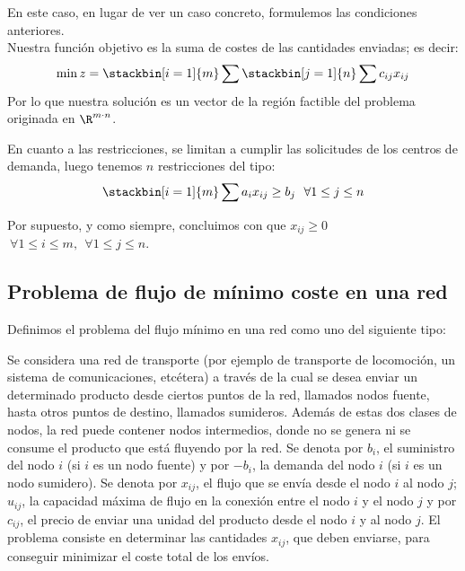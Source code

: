 \begin{ejem} En este caso, en lugar de ver un caso concreto, formulemos las condiciones anteriores.\\

Nuestra función objetivo es la suma de costes de las cantidades enviadas; es decir:
\[\min z=\stackbin[i=1]{m}\sum\stackbin[j=1]{n}\sum c_{ij}x_{ij}\]
Por lo que nuestra solución es un vector de la región factible del problema originada en $\R^{m\cdot n}$.

En cuanto a las restricciones, se limitan a cumplir las solicitudes de los centros de demanda, luego tenemos $n$ restricciones del tipo:
\[\stackbin[i=1]{m}\sum a_ix_{ij}\geq b_j\ \ \forall 1\leq j\leq n\]

Por supuesto, y como siempre, concluimos con que $x_{ij}\geq 0$ $\ \forall 1\leq i\leq m,\ \ \forall 1\leq j\leq n$.
\end{ejem}

\subsection{Problema de flujo de mínimo coste en una red}
\begin{defi} Definimos el problema del flujo mínimo en una red como uno del siguiente tipo:

Se considera una red de transporte (por ejemplo de transporte de locomoción, un sistema de comunicaciones, etcétera) a través de la cual se desea enviar un determinado producto desde ciertos puntos de la red, llamados nodos fuente, hasta otros puntos de destino, llamados sumideros. Además de estas dos clases de nodos, la red puede contener nodos intermedios, donde no se genera ni se consume el producto que está fluyendo por la red. Se denota por $b_i$, el suministro del nodo $i$ (si $i$ es un nodo fuente) y por $-b_i$, la demanda del nodo $i$ (si $i$ es un nodo sumidero). Se denota por $x_{ij}$, el flujo que se envía desde el nodo $i$ al nodo $j$; $u_{ij}$, la capacidad máxima de flujo en la conexión entre el nodo $i$ y el nodo $j$ y por $c_{ij}$, el precio de enviar una unidad del producto desde el nodo $i$ y al nodo $j$. El problema consiste en determinar las cantidades $x_{ij}$, que deben enviarse, para conseguir minimizar el coste total de los envíos.
\end{defi}

